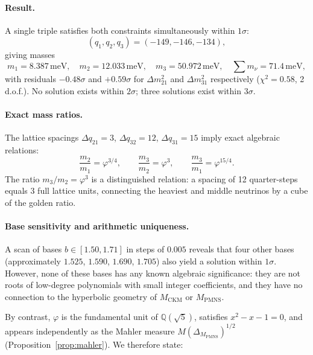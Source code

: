 ﻿\documentclass[12pt]{article}
\theoremstyle{definition}
\begin{document}
\paragraph{Result.}
A single triple satisfies both constraints simultaneously within
$1\sigma$:
\begin{equation}
(q_1,q_2,q_3) = (-149,-146,-134),
\end{equation}
giving masses
\begin{equation}
m_1 = 8.387\,\text{meV},\quad
m_2 = 12.033\,\text{meV},\quad
m_3 = 50.972\,\text{meV},\quad
\sum m_\nu = 71.4\,\text{meV},
\end{equation}
with residuals $-0.48\sigma$ and $+0.59\sigma$ for $\Delta m^2_{21}$
and $\Delta m^2_{31}$ respectively ($\chi^2 = 0.58$, 2\,d.o.f.).
No solution exists within $2\sigma$; three solutions exist within
$3\sigma$.

\paragraph{Exact mass ratios.}
The lattice spacings $\Delta q_{21}=3$, $\Delta q_{32}=12$,
$\Delta q_{31}=15$ imply exact algebraic relations:
\begin{equation}
\frac{m_2}{m_1} = \varphi^{3/4},\qquad
\frac{m_3}{m_2} = \varphi^{3},\qquad
\frac{m_3}{m_1} = \varphi^{15/4}.
\end{equation}
The ratio $m_3/m_2 = \varphi^3$ is a distinguished relation: a spacing
of 12 quarter-steps equals 3 full lattice units, connecting the heaviest
and middle neutrinos by a cube of the golden ratio.

\paragraph{Base sensitivity and arithmetic uniqueness.}
A scan of bases $b\in[1.50,1.71]$ in steps of $0.005$ reveals that
four other bases (approximately $1.525$, $1.590$, $1.690$, $1.705$)
also yield a solution within $1\sigma$.  However, none of these bases
has any known algebraic significance: they are not roots of low-degree
polynomials with small integer coefficients, and they have no connection
to the hyperbolic geometry of $M_\text{CKM}$ or $M_\text{PMNS}$.

By contrast, $\varphi$ is the fundamental unit of $\mathbb{Q}(\sqrt{5})$,
satisfies $x^2-x-1=0$, and appears independently as the Mahler measure
$M(\Delta_{M_\text{PMNS}})^{1/2}$ (Proposition~\ref{prop:mahler}).
We therefore state:
\end{document}
